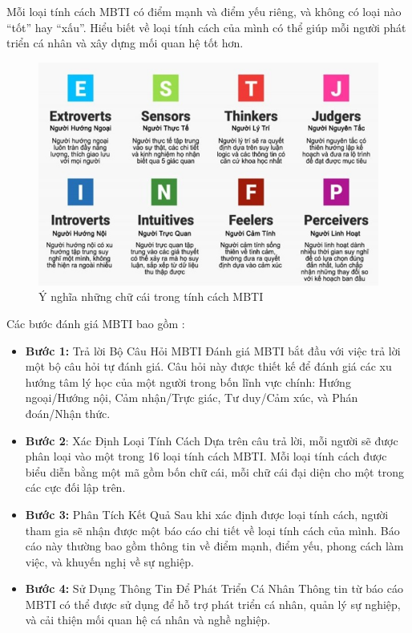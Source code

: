 Mỗi loại tính cách MBTI có điểm mạnh và điểm yếu riêng, và không có loại nào “tốt” hay “xấu”. Hiểu biết về loại tính cách của mình có thể giúp mỗi người phát triển cá nhân và xây dựng mối quan hệ tốt hơn.

\begin{figure}[H]
    \centering
    \includegraphics[width=0.8\linewidth, height=0.3\textheight]{images/MBTIper.png}
    \vspace{0.6cm}
    \caption{Ý nghĩa những chữ cái trong tính cách MBTI}
\end{figure}

Các bước đánh giá MBTI bao gồm : 
\begin{itemize}
    \item \textbf{Bước 1:} Trả lời Bộ Câu Hỏi MBTI Đánh giá MBTI bắt đầu với việc trả lời một bộ câu hỏi tự đánh giá. Câu hỏi này được thiết kế để đánh giá các xu hướng tâm lý học của một người trong bốn lĩnh vực chính: Hướng ngoại/Hướng nội, Cảm nhận/Trực giác, Tư duy/Cảm xúc, và Phán đoán/Nhận thức.
    \item \textbf{Bước 2}: Xác Định Loại Tính Cách Dựa trên câu trả lời, mỗi người sẽ được phân loại vào một trong 16 loại tính cách MBTI. Mỗi loại tính cách được biểu diễn bằng một mã gồm bốn chữ cái, mỗi chữ cái đại diện cho một trong các cực đối lập trên.
    \item \textbf{Bước 3:} Phân Tích Kết Quả Sau khi xác định được loại tính cách, người tham gia sẽ nhận được một báo cáo chi tiết về loại tính cách của mình. Báo cáo này thường bao gồm thông tin về điểm mạnh, điểm yếu, phong cách làm việc, và khuyến nghị về sự nghiệp.
    \item \textbf{Bước 4:} Sử Dụng Thông Tin Để Phát Triển Cá Nhân Thông tin từ báo cáo MBTI có thể được sử dụng để hỗ trợ phát triển cá nhân, quản lý sự nghiệp, và cải thiện mối quan hệ cá nhân và nghề nghiệp.
\end{itemize}

